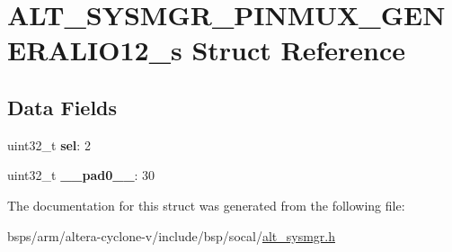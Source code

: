 \hypertarget{structALT__SYSMGR__PINMUX__GENERALIO12__s}{}\section{A\+L\+T\+\_\+\+S\+Y\+S\+M\+G\+R\+\_\+\+P\+I\+N\+M\+U\+X\+\_\+\+G\+E\+N\+E\+R\+A\+L\+I\+O12\+\_\+s Struct Reference}
\label{structALT__SYSMGR__PINMUX__GENERALIO12__s}
\subsection*{Data Fields}
\begin{DoxyCompactItemize}
\item 
\mbox{\label{structALT__SYSMGR__PINMUX__GENERALIO12__s_a91eb69fb8e531effc62e494fc50dfe93}} 
uint32\+\_\+t {\bfseries sel}\+: 2
\item 
\mbox{\label{structALT__SYSMGR__PINMUX__GENERALIO12__s_a386d1bf7776ec958d0814d4c5adb2ca9}} 
uint32\+\_\+t {\bfseries \+\_\+\+\_\+pad0\+\_\+\+\_\+}\+: 30
\end{DoxyCompactItemize}


The documentation for this struct was generated from the following file\+:\begin{DoxyCompactItemize}
\item 
bsps/arm/altera-\/cyclone-\/v/include/bsp/socal/\mbox{\hyperlink{alt__sysmgr_8h}{alt\+\_\+sysmgr.\+h}}\end{DoxyCompactItemize}
